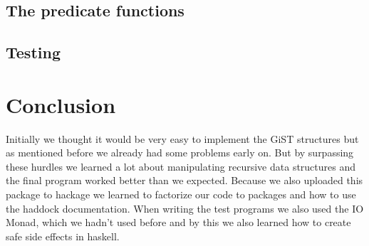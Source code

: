 \documentclass{scrartcl}
\begin{document}
\subsection{The predicate functions}

\subsection{Testing}


\section{Conclusion}

Initially we thought it would be very easy to implement the GiST structures but as mentioned before we already had some problems early on. But by surpassing 
these hurdles we learned a lot about manipulating recursive data structures and the final program worked better than we expected. Because we also uploaded
this package to hackage we learned to factorize our code to packages and how to use the haddock documentation. When writing the test programs we also used the IO Monad,
which we hadn't used before and by this we also learned how to create safe side effects in haskell. 

 

\end{document}
